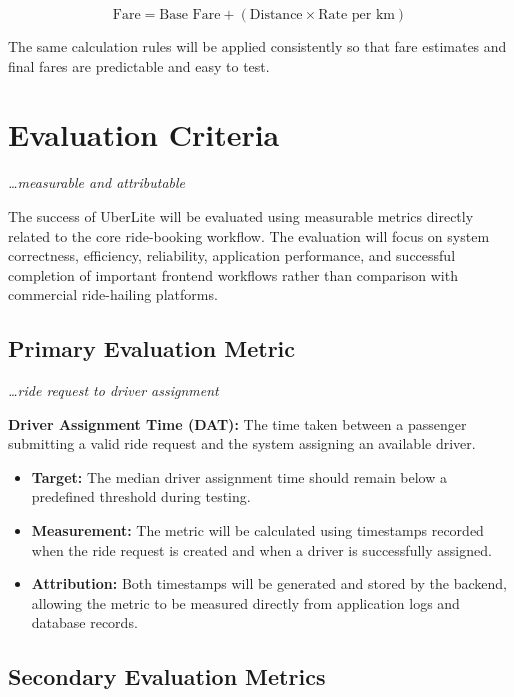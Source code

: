\documentclass[11pt,a4paper]{article}
\newcommand{\BvrHint}[1]{%
  {\normalfont\normalsize\itshape\hfill #1}}
\begin{document}
\[
\text{Fare} =
\text{Base Fare} +
(\text{Distance} \times \text{Rate per km})
\]

The same calculation rules will be applied consistently so that fare
estimates and final fares are predictable and easy to test.


\section{Evaluation Criteria}
\BvrHint{\ldots measurable and attributable}

The success of UberLite will be evaluated using measurable metrics
directly related to the core ride-booking workflow. The evaluation
will focus on system correctness, efficiency, reliability,
application performance, and successful completion of important
frontend workflows rather than comparison with commercial
ride-hailing platforms.


\subsection{Primary Evaluation Metric}
\BvrHint{\ldots ride request to driver assignment}

\textbf{Driver Assignment Time (DAT):} The time taken between a
passenger submitting a valid ride request and the system assigning
an available driver.

\begin{itemize}

    \item \textbf{Target:} The median driver assignment time should
    remain below a predefined threshold during testing.

    \item \textbf{Measurement:} The metric will be calculated using
    timestamps recorded when the ride request is created and when a
    driver is successfully assigned.

    \item \textbf{Attribution:} Both timestamps will be generated and
    stored by the backend, allowing the metric to be measured directly
    from application logs and database records.

\end{itemize}


\subsection{Secondary Evaluation Metrics}
\end{document}
